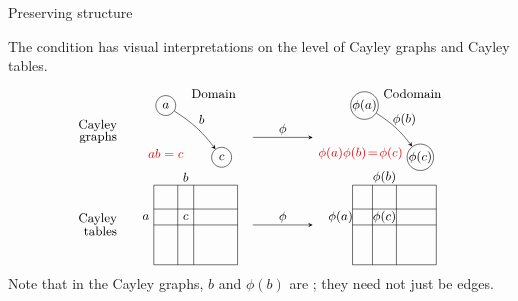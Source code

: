 \documentclass[8pt, handout]{beamer}
\begin{document}
\begin{frame}{Preserving structure}
  
  The  condition has visual interpretations
  on the level of Cayley graphs and Cayley tables.
  \[
  \begin{tikzpicture}
    \tikzstyle{to} = [draw, -stealth]
    \tikzstyle{v} = [circle, draw,inner sep=0pt, minimum size=5mm]
    \tikzstyle{every node}=[font=\small]
    \node[anchor=east] at (-.8,1.15) {Cayley};
    \node[anchor=east] at (-.8,.85) {tables};
    \node[anchor=east] at (-.8,3.5) {Cayley};
    \node[anchor=east] at (-.8,3.2) {graphs};
    \node at (.3,2.8) {\Alert{$ab=c$}};
    \node at (1.5,4.3) {Domain};
    \node (a) at (.3,4) [v] {$a$};
    \node (b) at (1.7,2.7) [v] {$c$};
    \draw[to,bend left=10] (a) to (b); 
    \node at (1.2,3.65) {$b$};
    \draw[thin] (0,0) rectangle (2.1,2);
    \draw[thin] (0,1) -- (2.1,1);
    \draw[thin] (0,1.4) -- (2.1,1.4);
    \draw[thin] (.6,0) -- (.6,2);
    \draw[thin] (1,0) -- (1,2);
    \node at (-.2,1.2) {$a$}; 
    \node at (.8,2.2) {$b$}; 
    \node at (.8,1.2) {$c$};
  \end{tikzpicture}
  \hspace{3mm}
  \begin{tikzpicture}
    \tikzstyle{to} = [draw, -stealth]
    \tikzstyle{v} = [circle, draw,inner sep=0pt, minimum size=5mm]
    \tikzstyle{every node}=[font=\small]
    \node at (1.5,4.3) {Codomain};
    \node (a) at (.3,4) [v] {$\phi(a)$};
    \node (b) at (1.7,2.7) [v] {$\phi(c)$};
    \draw[to,bend left=10] (a) to (b);
    \node at (1.3,3.65) {$\phi(b)$};
    \draw[thin,-stealth] (-2.5,3.2) -- (-1,3.2);
    \node at (-1.75,3.4) {$\phi$};
    \draw[thin,-stealth] (-2.5,1) -- (-1,1);
    \node at (-1.75,1.2) {$\phi$};
    \node at (.2,2.8) {\Alert{$\phi(a)\phi(b)\!=\!\phi(c)$}};
    \draw[thin] (0,0) rectangle (2.1,2);
    \draw[thin] (0,1) -- (2.1,1);
    \draw[thin] (0,1.4) -- (2.1,1.4);
    \draw[thin] (.5,0) -- (.5,2);
    \draw[thin] (1.1,0) -- (1.1,2);
    \node at (-.3,1.2) {$\phi(a)$}; 
    \node at (.8,2.2) {$\phi(b)$}; 
    \node at (.8,1.2) {$\phi(c)$};
  \end{tikzpicture}
  \]
  Note that in the Cayley graphs, $b$ and $\phi(b)$ are ; they
  need not just be edges.
  
\end{frame}
 
\end{document}
